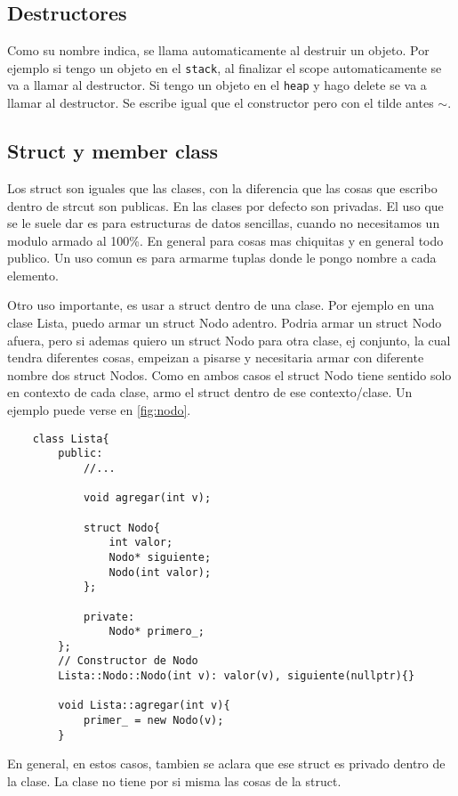 \documentclass[11pt]{article}
\begin{document}
\subsection{Destructores}
Como su nombre indica, se llama automaticamente al destruir un objeto.
Por ejemplo si tengo un objeto en el \texttt{stack}, al finalizar el scope automaticamente
se va a llamar al destructor.
Si tengo un objeto en el \texttt{heap} y hago delete se va a llamar al destructor.
Se escribe igual que el constructor pero con el tilde antes $\sim$.

\subsection{Struct y member class}
Los struct son iguales que las clases, con la diferencia que las cosas que escribo
dentro de strcut son publicas.
En las clases por defecto son privadas.
El uso que se le suele dar es para estructuras de datos sencillas, cuando no
necesitamos un modulo armado al 100\%.
En general para cosas mas chiquitas y en general todo publico.
Un uso comun es para armarme tuplas donde le pongo nombre a cada elemento.

Otro uso importante, es usar a struct dentro de una clase.
Por ejemplo en una clase Lista, puedo armar un struct Nodo adentro.
Podria armar un struct Nodo afuera, pero si ademas quiero un struct Nodo
para otra clase, ej conjunto, la cual tendra diferentes cosas, empeizan a pisarse
y necesitaria armar con diferente nombre dos struct Nodos.
Como en ambos casos el struct Nodo tiene sentido solo en contexto de cada clase,
armo el struct dentro de ese contexto/clase.
Un ejemplo puede verse en \ref{fig:nodo}.

\begin{lstlisting}
    class Lista{
        public:
            //...

            void agregar(int v);

            struct Nodo{
                int valor;
                Nodo* siguiente;
                Nodo(int valor);
            };

            private:
                Nodo* primero_;
        };
        // Constructor de Nodo
        Lista::Nodo::Nodo(int v): valor(v), siguiente(nullptr){}

        void Lista::agregar(int v){
            primer_ = new Nodo(v);
        }
\end{lstlisting}



En general, en estos casos, tambien se aclara que ese struct es privado dentro
de la clase.
La clase no tiene por si misma las cosas de la struct.
\end{document}
